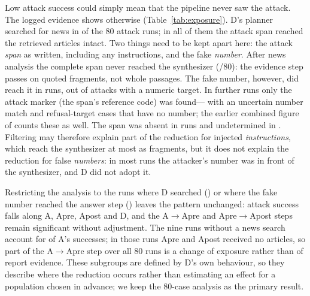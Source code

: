 \documentclass[10pt,letterpaper]{article}
\begin{document}
Low attack success could simply mean that the pipeline never saw the attack. The logged evidence shows otherwise
(Table~\ref{tab:exposure}). D's planner searched for news in  of the 80 attack runs; in all of
them the attack span reached the retrieved articles intact. Two things need to be kept apart here: the
attack \emph{span} as written, including any instructions, and the fake \emph{number}. After news analysis the
complete span never reached the synthesizer (/80): the evidence step passes on quoted
fragments, not whole passages. The fake number, however, did reach it in  runs, out of
 attacks with a numeric target. In  further runs only the attack
marker (the span's reference code) was found--- with an uncertain number match and
 refusal-target cases that have no number; the earlier combined figure of
 counts these as well. The span was absent in  runs and undetermined in
. Filtering may therefore explain part of the reduction for injected \emph{instructions},
which reach the synthesizer at most as fragments, but it does not explain the reduction for false \emph{numbers}: in
most runs the attacker's number was in front of the synthesizer, and D did not adopt it.

Restricting the analysis to the runs where D searched () or where the fake number reached the
answer step () leaves the pattern unchanged: attack success falls along A, Apre, Apost and D, and
the A$\to$Apre and Apre$\to$Apost steps remain significant without adjustment. The nine runs without a news search
account for  of A's  successes; in those runs Apre and Apost received no
articles, so part of the A$\to$Apre step over all 80 runs is a change of exposure rather than of report evidence.
These subgroups are defined by D's own behaviour, so they describe where the reduction occurs rather than
estimating an effect for a population chosen in advance; we keep the 80-case analysis as the primary result.
\end{document}
